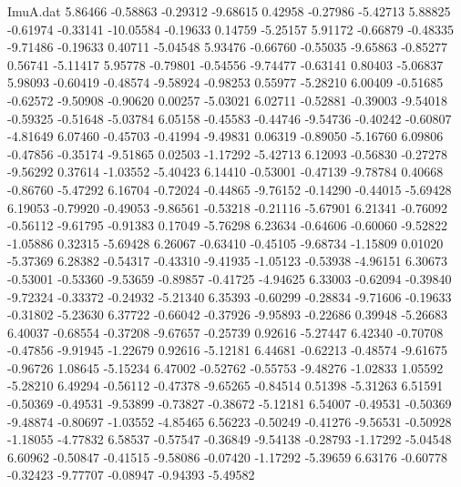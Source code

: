 \begin{filecontents}{ImuA.dat}
   5.86466   -0.58863   -0.29312   -9.68615    0.42958   -0.27986   -5.42713
   5.88825   -0.61974   -0.33141  -10.05584   -0.19633    0.14759   -5.25157
   5.91172   -0.66879   -0.48335   -9.71486   -0.19633    0.40711   -5.04548
   5.93476   -0.66760   -0.55035   -9.65863   -0.85277    0.56741   -5.11417
   5.95778   -0.79801   -0.54556   -9.74477   -0.63141    0.80403   -5.06837
   5.98093   -0.60419   -0.48574   -9.58924   -0.98253    0.55977   -5.28210
   6.00409   -0.51685   -0.62572   -9.50908   -0.90620    0.00257   -5.03021
   6.02711   -0.52881   -0.39003   -9.54018   -0.59325   -0.51648   -5.03784
   6.05158   -0.45583   -0.44746   -9.54736   -0.40242   -0.60807   -4.81649
   6.07460   -0.45703   -0.41994   -9.49831    0.06319   -0.89050   -5.16760
   6.09806   -0.47856   -0.35174   -9.51865    0.02503   -1.17292   -5.42713
   6.12093   -0.56830   -0.27278   -9.56292    0.37614   -1.03552   -5.40423
   6.14410   -0.53001   -0.47139   -9.78784    0.40668   -0.86760   -5.47292
   6.16704   -0.72024   -0.44865   -9.76152   -0.14290   -0.44015   -5.69428
   6.19053   -0.79920   -0.49053   -9.86561   -0.53218   -0.21116   -5.67901
   6.21341   -0.76092   -0.56112   -9.61795   -0.91383    0.17049   -5.76298
   6.23634   -0.64606   -0.60060   -9.52822   -1.05886    0.32315   -5.69428
   6.26067   -0.63410   -0.45105   -9.68734   -1.15809    0.01020   -5.37369
   6.28382   -0.54317   -0.43310   -9.41935   -1.05123   -0.53938   -4.96151
   6.30673   -0.53001   -0.53360   -9.53659   -0.89857   -0.41725   -4.94625
   6.33003   -0.62094   -0.39840   -9.72324   -0.33372   -0.24932   -5.21340
   6.35393   -0.60299   -0.28834   -9.71606   -0.19633   -0.31802   -5.23630
   6.37722   -0.66042   -0.37926   -9.95893   -0.22686    0.39948   -5.26683
   6.40037   -0.68554   -0.37208   -9.67657   -0.25739    0.92616   -5.27447
   6.42340   -0.70708   -0.47856   -9.91945   -1.22679    0.92616   -5.12181
   6.44681   -0.62213   -0.48574   -9.61675   -0.96726    1.08645   -5.15234
   6.47002   -0.52762   -0.55753   -9.48276   -1.02833    1.05592   -5.28210
   6.49294   -0.56112   -0.47378   -9.65265   -0.84514    0.51398   -5.31263
   6.51591   -0.50369   -0.49531   -9.53899   -0.73827   -0.38672   -5.12181
   6.54007   -0.49531   -0.50369   -9.48874   -0.80697   -1.03552   -4.85465
   6.56223   -0.50249   -0.41276   -9.56531   -0.50928   -1.18055   -4.77832
   6.58537   -0.57547   -0.36849   -9.54138   -0.28793   -1.17292   -5.04548
   6.60962   -0.50847   -0.41515   -9.58086   -0.07420   -1.17292   -5.39659
   6.63176   -0.60778   -0.32423   -9.77707   -0.08947   -0.94393   -5.49582

\end{filecontents}

